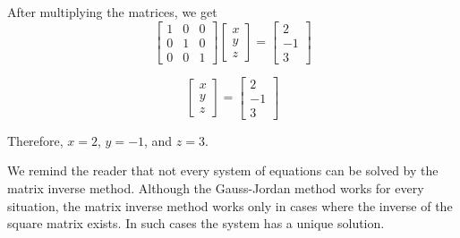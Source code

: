 \begin{solution}
    After multiplying the matrices, we get
    \[ \left[
            \begin{array}{ccc}
                1 & 0 & 0 \\
                0 & 1 & 0 \\
                0 & 0 & 1
            \end{array}
            \right]
        \left[
            \begin{array}{c}
                x \\
                y \\
                z
            \end{array}
            \right] =
        \left[
            \begin{array}{c}
                2  \\
                -1 \\
                3
            \end{array}
            \right] \]

    \[ \left[
            \begin{array}{c}
                x \\
                y \\
                z
            \end{array}
            \right] =
        \left[
            \begin{array}{c}
                2  \\
                -1 \\
                3
            \end{array}
            \right] \]

    Therefore, \( x = 2 \), \( y = -1 \), and \( z = 3 \).
\end{solution}

We remind the reader that not every system of equations can be solved by the matrix inverse method.  Although the Gauss-Jordan method works for every situation, the matrix inverse method works only in cases where the inverse of the square matrix exists.  In such cases the system has a unique solution.

